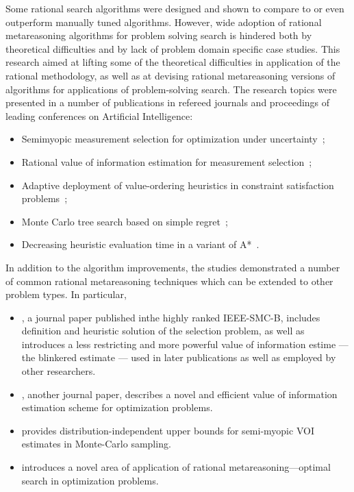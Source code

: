 \documentclass{article}
\begin{document}
Some rational search algorithms were designed and shown to compare to
or even outperform manually tuned algorithms. However, wide adoption of
rational metareasoning algorithms for problem solving search is hindered
both by theoretical difficulties and by lack of problem domain specific
case studies. This research aimed at lifting some of the theoretical
difficulties in application of the rational methodology, as well as
at devising rational metareasoning versions of
algorithms for applications of problem-solving search.
The research topics were presented in a number of publications in 
refereed journals and proceedings of leading conferences on Artificial Intelligence:
\begin {itemize}
\item Semimyopic measurement selection for optimization under
  uncertainty~\cite{TolpinShimony.blinkered};
\item Rational value of information estimation for measurement
		  selection~\cite{TolpinShimony.raticomp};
\item Adaptive deployment of value-ordering heuristics in constraint
  satisfaction problems~\cite{TolpinShimony.csp};
\item Monte Carlo tree search based on simple regret~\cite{TolpinShimony.mcts,HayRussellTolpinShimony.selecting};
\item Decreasing heuristic evaluation time in a variant of A*~\cite{TolpinEtAl.rla}. 
\end {itemize}
In addition to the algorithm improvements, the studies demonstrated a
number of common rational metareasoning techniques which can be 
extended to other problem types. In particular,
\begin{itemize}
\item \cite{TolpinShimony.blinkered}, a journal paper published inthe
  highly ranked IEEE-SMC-B, includes definition and heuristic 
  solution of the selection problem, as well as introduces a less
  restricting and more powerful value of information estime --- the
  blinkered estimate --- used in later publications as well as employed by other
  researchers.
\item \cite{TolpinShimony.raticomp}, another journal paper, describes a novel and
  efficient value of information estimation scheme for optimization problems. 
\item \cite{HayRussellTolpinShimony.selecting} provides
  distribution-independent upper bounds for semi-myopic VOI estimates in Monte-Carlo sampling.
\item \cite{TolpinEtAl.rla} introduces a novel area of application of rational
metareasoning---optimal search in optimization problems.
\end{itemize}
\end{document}
